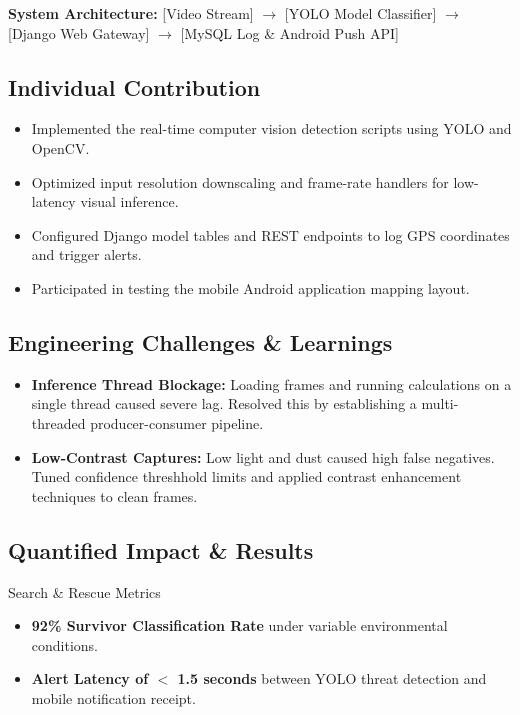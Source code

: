 \documentclass[11pt,letterpaper]{article}
\begin{document}
\begin{center}
    \small
    \textbf{System Architecture:} [Video Stream] $\rightarrow$ [YOLO Model Classifier] $\rightarrow$ [Django Web Gateway] $\rightarrow$ [MySQL Log \& Android Push API]
\end{center}

\subsection{Individual Contribution}
\begin{itemize}
    \item Implemented the real-time computer vision detection scripts using YOLO and OpenCV.
    \item Optimized input resolution downscaling and frame-rate handlers for low-latency visual inference.
    \item Configured Django model tables and REST endpoints to log GPS coordinates and trigger alerts.
    \item Participated in testing the mobile Android application mapping layout.
\end{itemize}

\subsection{Engineering Challenges \& Learnings}
\begin{itemize}
    \item \textbf{Inference Thread Blockage:} Loading frames and running calculations on a single thread caused severe lag. Resolved this by establishing a multi-threaded producer-consumer pipeline.
    \item \textbf{Low-Contrast Captures:} Low light and dust caused high false negatives. Tuned confidence threshhold limits and applied contrast enhancement techniques to clean frames.
\end{itemize}

\subsection{Quantified Impact \& Results}
\begin{metricbox}{Search \& Rescue Metrics}
    \begin{itemize}
        \item \textbf{92\% Survivor Classification Rate} under variable environmental conditions.
        \item \textbf{Alert Latency of $<$ 1.5 seconds} between YOLO threat detection and mobile notification receipt.
    \end{itemize}
\end{metricbox}
\end{document}
